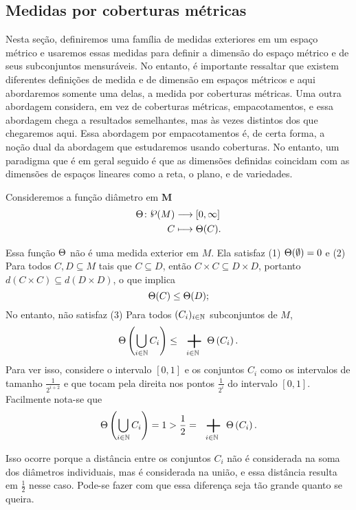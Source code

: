 
\subsection{Medidas por coberturas métricas}

Nesta seção, definiremos uma família de medidas exteriores em um espaço métrico e usaremos essas medidas para definir a dimensão do espaço métrico e de seus subconjuntos mensuráveis. No entanto, é importante ressaltar que existem diferentes definições de medida e de dimensão em espaços métricos e aqui abordaremos somente uma delas, a medida por coberturas métricas. Uma outra abordagem considera, em vez de coberturas métricas, empacotamentos, e essa abordagem chega a resultados semelhantes, mas às vezes distintos dos que chegaremos aqui. Essa abordagem por empacotamentos é, de certa forma, a noção dual da abordagem que estudaremos usando coberturas. No entanto, um paradigma que é em geral seguido é que as dimensões definidas coincidam com as dimensões de espaços lineares como a reta, o plano, e de variedades.

Consideremos a função diâmetro em $\bm M$
	\begin{align*}
	\func{\diam}{\p(M)}{[0,\infty]}{C}{\diam(C)}.
	\end{align*}

Essa função $\Theta$ não é uma medida exterior em $M$. Ela satisfaz (1) $\Theta(\emptyset)=0$ e (2) Para todos $C,D \subseteq M$ tais que $C \subseteq D$, então $C \times C \subseteq D \times D$, portanto $d(C \times C) \subseteq d(D \times D)$, o que implica
	\begin{equation*}
	\Theta(C) \leq \Theta(D);
	\end{equation*}
No entanto, não satisfaz
(3) Para todos $(C_i)_{i \in \mathbb{N}}$ subconjuntos de $M$,
	\begin{equation*}
	\diam\left( \bigcup_{i \in \N} C_i \right) \leq \sum_{i \in \N} \diam\left( C_i \right).
	\end{equation*}
Para ver isso, considere o intervalo $[0,1]$ e os conjuntos $C_i$ como os intervalos de tamanho $\frac{1}{2^{i+2}}$ e que tocam pela direita nos pontos $\frac{1}{2^i}$ do intervalo $[0,1]$. Facilmente nota-se que
	\begin{equation*}
	\diam\left( \bigcup_{i \in \N} C_i \right) = 1 > \frac{1}{2} = \sum_{i \in \N} \diam\left( C_i \right).
	\end{equation*}

Isso ocorre porque a distância entre os conjuntos $C_i$ não é considerada na soma dos diâmetros individuais, mas é considerada na união, e essa distância resulta em $\frac{1}{2}$ nesse caso. Pode-se fazer com que essa diferença seja tão grande quanto se queira.

